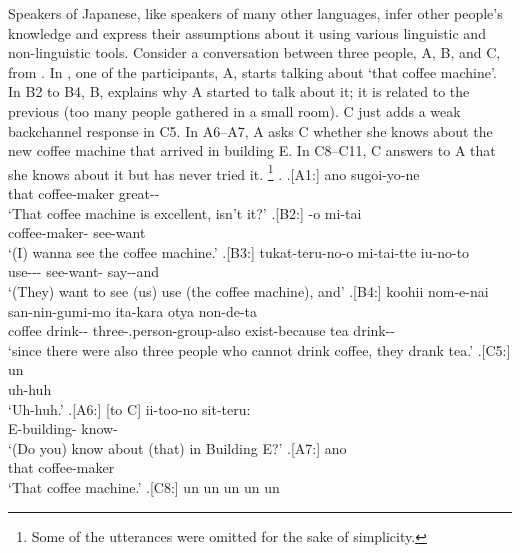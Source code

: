 Speakers of Japanese, like speakers of many other languages,
infer other people's knowledge and
express their assumptions about it using various linguistic and non-linguistic tools.
Consider a conversation between three people, A, B, and C,
from  \cite{Den_2007_SAC}.
In \Next[-A1],
one of the participants, A, starts talking about  `that coffee machine'.
In B2 to B4, B, explains why A started to talk about it;
it is related to the previous  (too many people gathered in a small room).
C just adds a weak backchannel response in C5.
In A6--A7,
A asks C whether she knows about the new coffee machine that arrived in building E.
In C8--C11,
C answers to A that
she knows about it but has never tried it.%
	\footnote{
	Some of the utterances were omitted for the sake of simplicity.
	}
%
\ex.
 \ag.[A1:] ano  sugoi-yo-ne \\
      that coffee-maker great-- \\
      `That coffee machine is excellent, isn't it?'
 \bg.[B2:] -o mi-tai \\
          coffee-maker- see-want \\
          `(I) wanna see the coffee machine.'
 \bg.[B3:] tukat-teru-no-o mi-tai-tte iu-no-to \\
           use--- see-want- say--and \\
           `(They) want to see (us) use (the coffee machine), and'
 \bg.[B4:] koohii nom-e-nai san-nin-gumi-mo ita-kara otya non-de-ta \\
           coffee drink-- three-.person-group-also exist-because tea drink-- \\
           `since there were also three people who cannot drink coffee, they drank tea.'
 \bg.[C5:] un \\
           uh-huh \\
           `Uh-huh.'
 \bg.[A6:] [to C] ii-too-no sit-teru: \\
           {} {} E-building- know- \\
           `(Do you) know about (that) in Building E?'
 \bg.[A7:] ano  \\
           that coffee-maker \\
           `That coffee machine.'
 \bg.[C8:] un un un un un \\
